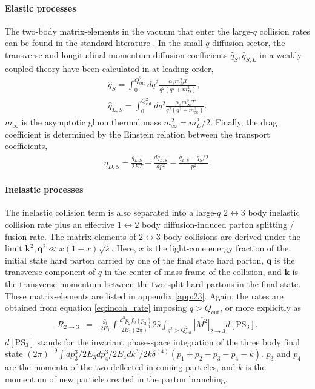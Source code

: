 \documentclass[aps, prc, reprint, amsmath, groupedaddress, nofootinbib]{revtex4-1}
\begin{document}
\paragraph{Elastic processes} The two-body matrix-elements in the vacuum that enter the large-$q$ collision rates can be found in the standard literature \cite{RevModPhys.59.465}.
In the small-$q$ diffusion sector, the transverse and longitudinal momentum diffusion coefficients $\hat{q}_S, \hat{q}_{S,L}$ in a weakly coupled theory have been calculated in \cite{Ghiglieri:2015ala} at leading order,
\begin{eqnarray}
\hat{q}_S = \int_0^{Q_{\textrm{cut}}^2} dq^2 \frac{\alpha_s m_D^2 T}{q^2 (q^2+m_D^2)},
\label{eq:qS} \\
\hat{q}_{L,S} = \int_0^{Q_{\textrm{cut}}^2} dq^2 \frac{\alpha_s m_\infty^2 T}{q^2 (q^2+m_\infty^2)}.
\label{eq:qSL}
\end{eqnarray}
$m_{\infty}$ is the asymptotic gluon thermal mass $m_{\infty}^2 = m_D^2/2$.
Finally, the drag coefficient is determined by the Einstein relation between the transport coefficients,
\begin{eqnarray}
\eta_{D,S} = \frac{\hat{q}_{L,S}}{2ET} - \frac{d\hat{q}_{L,S}}{dp^2} - \frac{\hat{q}_{L,S} - \hat{q}_S/2}{p^2}.
\end{eqnarray}

\paragraph{Inelastic processes} The inelastic collision term is also separated into a large-$q$ $2\leftrightarrow 3$ body inelastic collision rate plus an effective $1\leftrightarrow 2$ body diffusion-induced parton splitting / fusion rate.
The matrix-elements of $2\leftrightarrow 3$ body collisions are derived under the limit $\mathbf{k}^2, \mathbf{q}^2 \ll x(1-x)\sqrt{\hat{s}}$.
Here, $x$ is the light-cone energy fraction of the initial state hard parton carried by one of the final state hard parton, $\mathbf{q}$ is the transverse component of $q$ in the center-of-mass frame of the collision, and $\mathbf{k}$ is the transverse momentum between the two split hard partons in the final state. 
These matrix-elements are listed in appendix \ref{app:23}.
Again, the rates are obtained from equation \ref{eq:incoh_rate} imposing $q>Q_{\textrm{cut}}$, or more explicitly as
\begin{eqnarray}\nonumber
R_{2\rightarrow 3} &=& \frac{g_i}{2E_1}\int  \frac{d^3p_2f_0(p_2)}{2E_2(2\pi)^3} 2\hat{s} \int_{q^2 > Q_{\textrm{cut}}^2} \overline{|M^2|}_{2\rightarrow 3} d[\textrm{PS}_3]  \label{eq:rate23}.
\end{eqnarray}
$d[\textrm{PS}_3]$ stands for the invariant phase-space integration of the three body final state $(2\pi)^{-9}\int dp_3^3/2E_3 dp_4^3/2E_4 dk^3/2k \delta^{(4)}(p_1+p_2-p_3-p_4-k)$. $p_3$ and $p_4$ are the momenta of the two deflected in-coming particles, and $k$ is the momentum of new particle created in the parton branching.
\end{document}
